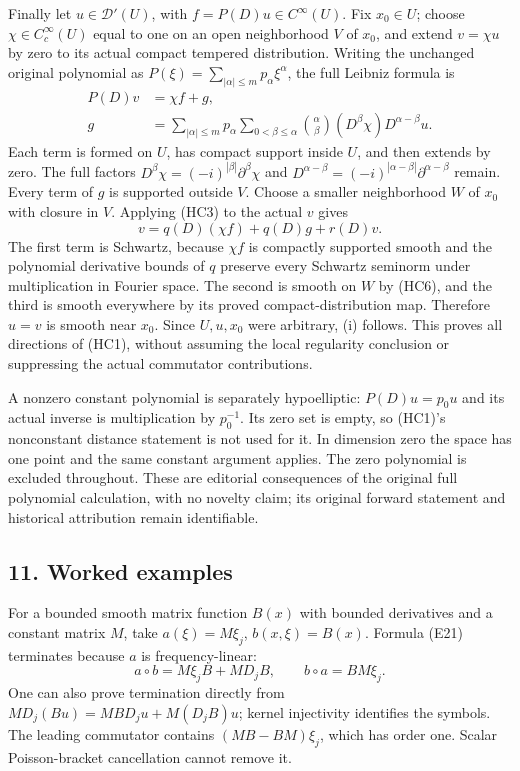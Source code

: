 \documentclass[
  11pt,
]{article}
\begin{document}
Finally let \(u\in\mathcal D'(U)\), with \(f=P(D)u\in C^\infty(U)\). Fix
\(x_0\in U\); choose \(\chi\in C_c^\infty(U)\) equal to one on an open
neighborhood \(V\) of \(x_0\), and extend \(v=\chi u\) by zero to its
actual compact tempered distribution. Writing the unchanged original
polynomial as \(P(\xi)=\sum_{|\alpha|\le m}p_\alpha\xi^\alpha\), the
full Leibniz formula is \[
\begin{aligned}
P(D)v&=\chi f+g,\\
g&=\sum_{|\alpha|\le m}p_\alpha
 \sum_{0<\beta\le\alpha}\binom\alpha\beta
 (D^\beta\chi)D^{\alpha-\beta}u.
\end{aligned}
\tag{HC7}
\] Each term is formed on \(U\), has compact support inside \(U\), and
then extends by zero. The full factors
\(D^\beta\chi=(-i)^{|\beta|}\partial^\beta\chi\) and
\(D^{\alpha-\beta}=(-i)^{|\alpha-\beta|}\partial^{\alpha-\beta}\)
remain. Every term of \(g\) is supported outside \(V\). Choose a smaller
neighborhood \(W\) of \(x_0\) with closure in \(V\). Applying (HC3) to
the actual \(v\) gives \[
v=q(D)(\chi f)+q(D)g+r(D)v.
\tag{HC8}
\] The first term is Schwartz, because \(\chi f\) is compactly supported
smooth and the polynomial derivative bounds of \(q\) preserve every
Schwartz seminorm under multiplication in Fourier space. The second is
smooth on \(W\) by (HC6), and the third is smooth everywhere by its
proved compact-distribution map. Therefore \(u=v\) is smooth near
\(x_0\). Since \(U,u,x_0\) were arbitrary, (i) follows. This proves all
directions of (HC1), without assuming the local regularity conclusion or
suppressing the actual commutator contributions.

A nonzero constant polynomial is separately hypoelliptic: \(P(D)u=p_0u\)
and its actual inverse is multiplication by \(p_0^{-1}\). Its zero set
is empty, so (HC1)'s nonconstant distance statement is not used for it.
In dimension zero the space has one point and the same constant argument
applies. The zero polynomial is excluded throughout. These are editorial
consequences of the original full polynomial calculation, with no
novelty claim; its original forward statement and historical attribution
remain identifiable.

\subsection{11. Worked examples}\label{worked-examples}

For a bounded smooth matrix function \(B(x)\) with bounded derivatives
and a constant matrix \(M\), take \(a(\xi)=M\xi_j\), \(b(x,\xi)=B(x)\).
Formula (E21) terminates because \(a\) is frequency-linear: \[
a\circ b=M\xi_jB+M D_jB,
\qquad b\circ a=BM\xi_j.
\tag{E46}
\] One can also prove termination directly from
\(MD_j(Bu)=MB D_ju+M(D_jB)u\); kernel injectivity identifies the
symbols. The leading commutator contains \((MB-BM)\xi_j\), which has
order one. Scalar Poisson-bracket cancellation cannot remove it.
\end{document}

